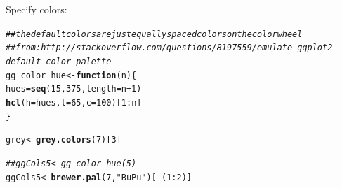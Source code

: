 \documentclass{article}\usepackage[]{graphicx}\usepackage[]{color}
\makeatletter
\newcommand{\hlnum}[1]{\textcolor[rgb]{0.686,0.059,0.569}{#1}}%
\newcommand{\hlstr}[1]{\textcolor[rgb]{0.192,0.494,0.8}{#1}}%
\newcommand{\hlcom}[1]{\textcolor[rgb]{0.678,0.584,0.686}{\textit{#1}}}%
\newcommand{\hlopt}[1]{\textcolor[rgb]{0,0,0}{#1}}%
\newcommand{\hlstd}[1]{\textcolor[rgb]{0.345,0.345,0.345}{#1}}%
\newcommand{\hlkwa}[1]{\textcolor[rgb]{0.161,0.373,0.58}{\textbf{#1}}}%
\newcommand{\hlkwb}[1]{\textcolor[rgb]{0.69,0.353,0.396}{#1}}%
\newcommand{\hlkwc}[1]{\textcolor[rgb]{0.333,0.667,0.333}{#1}}%
\newcommand{\hlkwd}[1]{\textcolor[rgb]{0.737,0.353,0.396}{\textbf{#1}}}%
\newenvironment{kframe}{%
 \def\at@end@of@kframe{}%
 \ifinner\ifhmode%
  \def\at@end@of@kframe{\end{minipage}}%
  \begin{minipage}{\columnwidth}%
 \fi\fi%
 \def\FrameCommand##1{\hskip\@totalleftmargin \hskip-\fboxsep
 \colorbox{shadecolor}{##1}\hskip-\fboxsep
     \hskip-\linewidth \hskip-\@totalleftmargin \hskip\columnwidth}%
 \MakeFramed {\advance\hsize-\width
   \@totalleftmargin\z@ \linewidth\hsize
   \@setminipage}}%
 {\par\unskip\endMakeFramed%
 \at@end@of@kframe}
\newenvironment{knitrout}{}{} %
\makeatother
\begin{document}
Specify colors:
\begin{knitrout}
\color{fgcolor}\begin{kframe}
\begin{alltt}
\hlcom{##the default colors are just equally spaced colors on the color wheel}
\hlcom{##from: http://stackoverflow.com/questions/8197559/emulate-ggplot2-default-color-palette}
\hlstd{gg_color_hue} \hlkwb{<-} \hlkwa{function}\hlstd{(}\hlkwc{n}\hlstd{) \{}
  \hlstd{hues} \hlkwb{=} \hlkwd{seq}\hlstd{(}\hlnum{15}\hlstd{,} \hlnum{375}\hlstd{,} \hlkwc{length}\hlstd{=n}\hlopt{+}\hlnum{1}\hlstd{)}
  \hlkwd{hcl}\hlstd{(}\hlkwc{h}\hlstd{=hues,} \hlkwc{l}\hlstd{=}\hlnum{65}\hlstd{,} \hlkwc{c}\hlstd{=}\hlnum{100}\hlstd{)[}\hlnum{1}\hlopt{:}\hlstd{n]}
\hlstd{\}}

\hlstd{grey} \hlkwb{<-} \hlkwd{grey.colors}\hlstd{(}\hlnum{7}\hlstd{)[}\hlnum{3}\hlstd{]}

\hlcom{##ggCols5 <- gg_color_hue(5)}
\hlstd{ggCols5} \hlkwb{<-} \hlkwd{brewer.pal}\hlstd{(}\hlnum{7}\hlstd{,} \hlstr{"BuPu"}\hlstd{)[}\hlopt{-}\hlstd{(}\hlnum{1}\hlopt{:}\hlnum{2}\hlstd{)]}
\end{alltt}
\end{kframe}
\end{knitrout}
\end{document}
